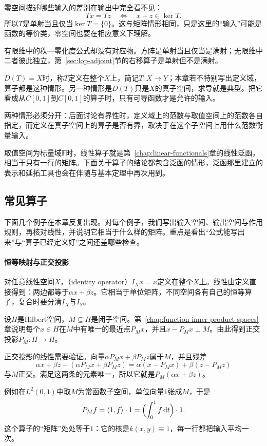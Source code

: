 零空间描述哪些输入的差别在输出中完全看不见：
\[
 Tx=Tz\quad\Longleftrightarrow\quad x-z\in\ker T.
\]
所以$T$是单射当且仅当$\ker T=\{0\}$。这与矩阵情形相同，只是这里的“输入”可能是函数的等价类，零空间也要在相应意义下理解。

有限维中的秩—零化度公式却没有对应物。方阵是单射当且仅当是满射；无限维中二者彼此独立，第~\ref{sec:lop-adjoint}节的右移算子是单射但不是满射。

$D(T)=X$时，称$T$定义在整个$X$上，简记$T:X\to Y$；本章若不特别写出定义域，算子都是这种情形。另一种情形是$D(T)$只是$X$的真子空间，求导就是典型。把它看成从$C[0,1]$到$C[0,1]$的算子时，只有可导函数才是允许的输入。

两种情形必须分开：后面讨论有界性时，定义域上的范数与取值空间上的范数各自指定，而定义在真子空间上的算子是否有界，取决于在这个子空间上用什么范数衡量输入。

取值空间为标量域$\mathbb F$时，线性算子就是第~\ref{chap:linear-functionals}章的线性泛函，相当于只有一行的矩阵。下面关于算子的结论都包含泛函的情形，泛函那里建立的表示和延拓工具也会在伴随与基本定理中再次用到。

\subsection{常见算子}
\label{sec:lop-common-operators}

下面几个例子在本章反复出现。对每个例子，我们写出输入空间、输出空间与作用规则，再核对线性，并说明它相当于什么样的矩阵。重点是看出“公式能写出来”与“算子已经定义好”之间还差哪些检查。

\paragraph{恒等映射与正交投影}
对任意线性空间$X$，（identity operator）$I_Xx=x$定义在整个$X$上。线性由定义直接得到：两边都等于$\alpha x+\beta z$。它相当于单位矩阵，不同空间各有自己的恒等算子，复合时要分清$I_X$与$I_Y$。

设$H$是Hilbert空间，$M\subseteq H$是闭子空间。第~\ref{chap:function-inner-product-spaces}章说明每个$x\in H$在$M$中有唯一的最近点$P_Mx$，并且$x-P_Mx\perp M$。由此得到正交投影$P_M:H\to H$。

正交投影的线性需要验证。向量$\alpha P_Mx+\beta P_Mz$属于$M$，并且残差
\[
 \alpha x+\beta z-(\alpha P_Mx+\beta P_Mz)=\alpha(x-P_Mx)+\beta(z-P_Mz)
\]
与$M$正交。满足这两条的元素唯一，所以它就是$P_M(\alpha x+\beta z)$。

例如在$L^2(0,1)$中取$M$为常函数子空间，单位向量$1$张成$M$，于是
\[
 P_Mf=\langle1,f\rangle\cdot1=\Bigl(\int_0^1f\,\mathrm dt\Bigr)\cdot1.
\]
这个算子的“矩阵”处处等于$1$：它的核是$k(x,y)\equiv1$，每一行都把输入平均一次。

